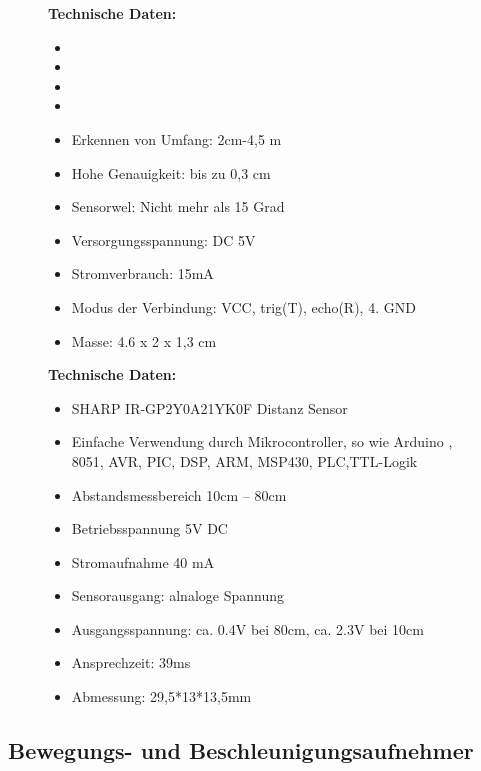 \begin{figure}[htb]
	\centering
	\begin{minipage}{0.45\linewidth}
		\textbf{Technische Daten:}
		\begin{itemize}
			\item
			\item
			\item
			\item
			\item 	Erkennen von Umfang: 2cm-4,5 m
			\item 	Hohe Genauigkeit: bis zu 0,3 cm
			\item 	Sensorwel: Nicht mehr als 15 Grad
			\item 	Versorgungsspannung: DC 5V
			\item Stromverbrauch: 15mA
			\item Modus der Verbindung: VCC, trig(T), echo(R), 4. GND
			\item Masse: 4.6 x 2 x 1,3 cm
		\end{itemize}
	\end{minipage}
	\begin{minipage}[h]{0.45\textwidth}
		\textbf{Technische Daten:}
		\begin{itemize}
			\item SHARP IR-GP2Y0A21YK0F Distanz Sensor
			\item Einfache Verwendung durch Mikrocontroller, so wie Arduino , 8051, AVR, PIC, DSP, ARM, MSP430, PLC,TTL-Logik
			\item Abstandsmessbereich 10cm – 80cm
			\item Betriebsspannung 5V DC
			\item Stromaufnahme 40 mA
			\item Sensorausgang: alnaloge Spannung
			\item Ausgangsspannung: ca. 0.4V bei 80cm, ca. 2.3V bei 10cm
			\item Ansprechzeit: 39ms
			\item Abmessung: 29,5*13*13,5mm

		\end{itemize}
	\end{minipage}
\end{figure}

\newpage

\subsection{Bewegungs- und Beschleunigungsaufnehmer }


